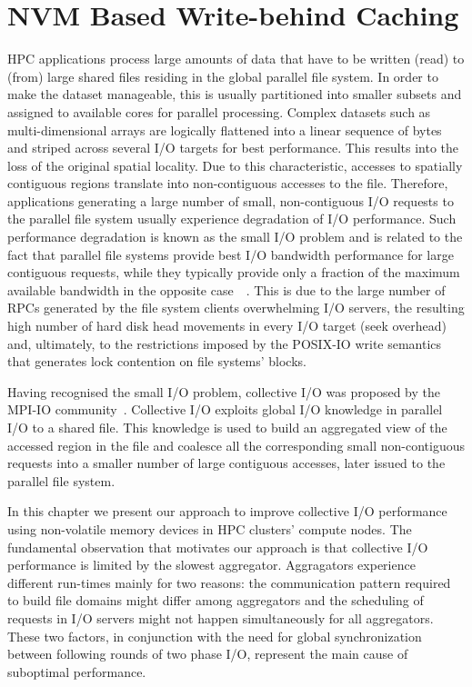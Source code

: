 \chapter{NVM Based Write-behind Caching} \label{chapt: checkpointing}
HPC applications process large amounts of data that have to be written (read) to (from) large shared files residing in the global parallel file system. In order to make the dataset manageable, 
this is usually partitioned into smaller subsets and assigned to available cores for parallel processing. Complex datasets such as multi-dimensional arrays are logically flattened into a linear 
sequence of bytes and striped across several I/O targets for best performance. This results into the loss of the original spatial locality. Due to this characteristic, accesses to spatially contiguous 
regions translate into non-contiguous accesses to the file. Therefore, applications generating a large number of small, non-contiguous I/O requests to the parallel file system usually experience 
degradation of I/O performance. Such performance degradation is known as the small I/O problem and is related to the fact that parallel file systems provide best I/O bandwidth performance for large 
contiguous requests, while they typically provide only a fraction of the maximum available bandwidth in the opposite case~\cite{ChingCLP06}~\cite{HeSSYT11}. This is due to the large number of RPCs 
generated by the file system clients overwhelming I/O servers, the resulting high number of hard disk head movements in every I/O target (seek overhead) and, ultimately, to the restrictions imposed 
by the POSIX-IO write semantics that generates lock contention on file systems' blocks.

Having recognised the small I/O problem, collective I/O was proposed by the MPI-IO community~\cite{ThakurGL99}. Collective I/O exploits global I/O knowledge in parallel I/O to a shared file. This 
knowledge is used to build an aggregated view of the accessed region in the file and coalesce all the corresponding small non-contiguous requests into a smaller number of large contiguous accesses, 
later issued to the parallel file system. 

In this chapter we present our approach to improve collective I/O performance using non-volatile memory devices in HPC clusters' compute nodes. The fundamental observation that motivates our approach 
is that collective I/O performance is limited by the slowest aggregator. Aggragators experience different run-times mainly for two reasons: the communication pattern required to build file domains might 
differ among aggregators and the scheduling of requests in I/O servers might not happen simultaneously for all aggregators. These two factors, in conjunction with the need for global synchronization 
between following rounds of two phase I/O, represent the main cause of suboptimal performance.

